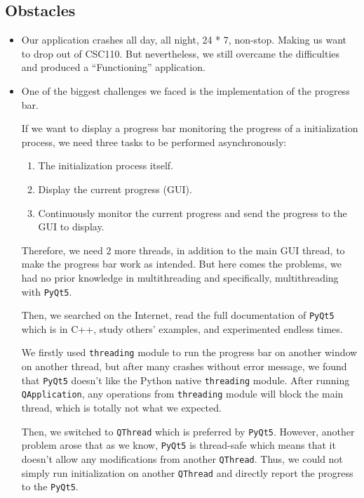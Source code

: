 \documentclass[fontsize=11pt]{article}
\begin{document}
    \subsection{Obstacles}

    \begin{itemize}
        \item Our application crashes all day, all night, 24 * 7, non-stop. Making us want to drop out of CSC110. But nevertheless, we still overcame the difficulties and produced a ``Functioning'' application.
        \item One of the biggest challenges we faced is the implementation of the progress bar.
        
        If we want to display a progress bar monitoring the progress of a initialization process, we need three tasks to be performed asynchronously:
        \begin{enumerate}
            \item The initialization process itself.
            \item Display the current progress (GUI).
            \item Continuously monitor the current progress and send the progress to the GUI to display.
        \end{enumerate}

        Therefore, we need 2 more threads, in addition to the main GUI thread, to make the progress bar work as intended. But here comes the problems, we had no prior knowledge in multithreading and specifically, multithreading with \verb|PyQt5|. 

        Then, we searched on the Internet, read the full documentation of \verb|PyQt5| which is in C++, study others' examples, and experimented endless times.
        
        We firstly used \verb|threading| module to run the progress bar on another window on another thread, but after many crashes without error message, we found that \verb|PyQt5| doesn't like the Python native \verb|threading| module. After running \verb|QApplication|, any operations from \verb|threading| module will block the main thread, which is totally not what we expected.

        Then, we switched to \verb|QThread| which is preferred by \verb|PyQt5|. However, another problem arose that as we know, \verb|PyQt5| is thread-safe which means that it doesn't allow any modifications from another \verb|QThread|. Thus, we could not simply run initialization on another \verb|QThread| and directly report the progress to the \verb|PyQt5|.


\end{itemize}
\end{document}
